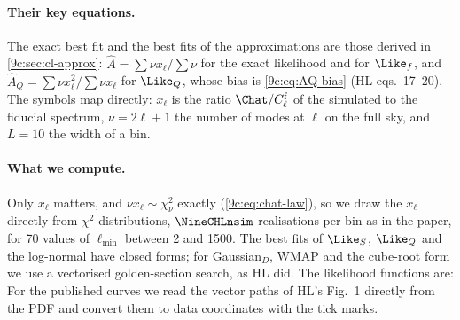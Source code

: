 \paragraph{Their key equations.} The exact best fit and the best fits of the approximations are those derived
in \cref{9c:sec:cl-approx}: $\hat A=\sum\nu x_\ell/\sum\nu$ for the exact likelihood and for $\Like_f$, and
$\hat A_Q=\sum\nu x_\ell^2/\sum\nu x_\ell$ for $\Like_Q$, whose bias is \eqref{9c:eq:AQ-bias} (HL eqs.~17--20). The
symbols map directly: $x_\ell$ is the ratio $\Chat/C^{\rm f}_\ell$ of the simulated to the fiducial spectrum,
$\nu=2\ell+1$ the number of modes at $\ell$ on the full sky, and $L=10$ the width of a bin.

\paragraph{What we compute.} Only $x_\ell$ matters, and $\nu x_\ell\sim\chi^2_\nu$ exactly
(\eqref{9c:eq:chat-law}), so we draw the $x_\ell$ directly from $\chi^2$ distributions, $\NineCHLnsim$
realisations per bin as in the paper, for 70 values of $\ell_{\min}$ between 2 and 1500. The best fits of
$\Like_S$, $\Like_Q$ and the log-normal have closed forms; for Gaussian$_D$, WMAP and the cube-root form we use a
vectorised golden-section search, as HL did. The likelihood functions are:
For the published curves we read the vector paths of HL's Fig.~1 directly from the PDF and convert them
to data coordinates with the tick marks.

